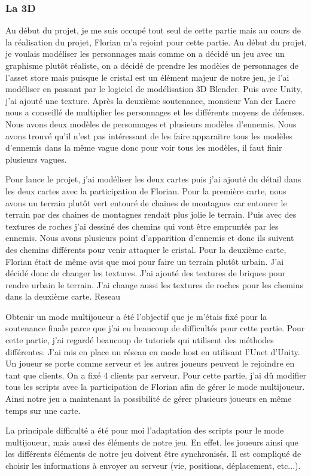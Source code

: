 \documentclass[a4paper, 12pt]{article}
\begin{document}
\subsubsection{La 3D}
Au début du projet, je me suis occupé tout seul de cette partie mais au cours de la réalisation du projet, Florian m’a rejoint pour cette partie. Au début du projet, je voulais modéliser les personnages mais comme on a décidé un jeu avec un graphisme plutôt réaliste, on a décidé de prendre les modèles de personnages de l’asset  store mais puisque le cristal est un élément majeur de notre jeu, je l’ai modéliser en passant par le logiciel de modélisation 3D Blender. Puis avec Unity, j’ai ajouté une texture. Après la deuxième soutenance, monsieur Van der Laere nous a conseillé de multiplier les personnages et les différents moyens de défenses. Nous avons deux modèles de personnages et plusieurs modèles d’ennemis. Nous avons trouvé qu’il n’est pas intéressant de les faire apparaitre tous les modèles d’ennemis dans la même vague donc pour voir tous les modèles, il faut finir plusieurs vagues.
\par Pour lance le projet, j’ai modéliser les deux cartes puis j’ai ajouté du détail dans les deux cartes avec la participation de Florian. Pour la première carte, nous avons un terrain plutôt vert entouré de chaines de montagnes car entourer le terrain par des chaines de montagnes rendait plus jolie le terrain. Puis avec des textures de roches j’ai dessiné des chemins qui vont être empruntés par les ennemis. Nous avons plusieurs point d’apparition d’ennemis et donc ils suivent des chemins différents pour venir attaquer le cristal. Pour la deuxième carte, Florian était de même avis que moi pour faire un terrain plutôt urbain. J’ai décidé donc de changer les textures. J’ai ajouté des textures de briques pour rendre urbain le terrain. J’ai change aussi les textures de roches pour les chemins dans la deuxième carte.
Reseau
\par Obtenir un mode multijoueur a été l’objectif que je m’étais fixé pour la soutenance finale parce que j’ai eu beaucoup de difficultés pour cette partie. Pour cette partie, j’ai regardé beaucoup de tutoriels qui utilisent des méthodes différentes. J’ai mis en place un réseau en mode host en utilisant l’Unet d'Unity. Un joueur se porte comme serveur et les autres joueurs peuvent le rejoindre en tant que clients. On a fixé 4 clients par serveur. Pour cette partie, j’ai dû modifier tous les scripts avec la participation de Florian afin de gérer le mode multijoueur. Ainsi notre jeu a maintenant la possibilité de gérer plusieurs joueurs en même temps sur une carte.
\par La principale difficulté a été pour moi l’adaptation des scripts pour le mode multijoueur, mais aussi des éléments de notre jeu. En effet, les joueurs ainsi que les différents éléments de notre jeu doivent être synchronisés. Il est compliqué de choisir les informations à envoyer au serveur (vie, positions, déplacement, etc...).
\end{document}
